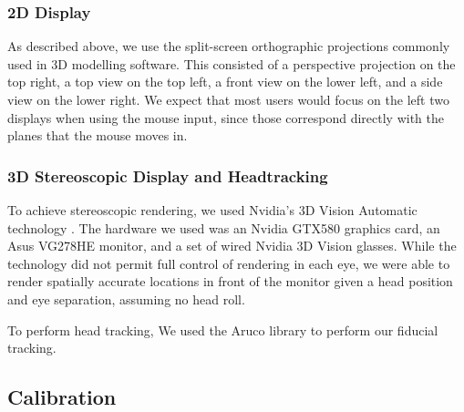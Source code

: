 \subsubsection{2D Display}
As described above, we use the split-screen orthographic projections commonly
used in 3D modelling software. This consisted of a perspective projection on the
top right, a top view on the top left, a front view on the lower left, and a
side view on the lower right. We expect that most users would focus on the left
two displays when using the mouse input, since those correspond directly with
the planes that the mouse moves in.

\subsubsection{3D Stereoscopic Display and Headtracking}
To achieve stereoscopic rendering, we used Nvidia's 3D Vision Automatic
technology \cite{nvidia3dvision}. The hardware we used was an Nvidia GTX580
graphics card, an Asus
VG278HE monitor, and a set of wired Nvidia 3D Vision glasses. While the
technology did not permit full control of rendering in each eye, we were able to
render spatially accurate locations in front of the monitor given a head
position and eye separation, assuming no head roll.

To perform head tracking, %
We used the Aruco library \cite{aruco} to perform our fiducial tracking.
\subsection{Calibration}
